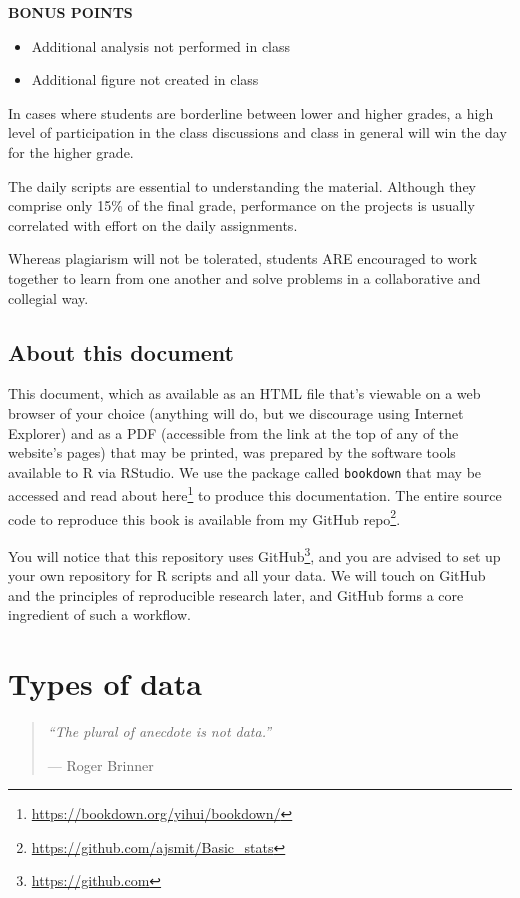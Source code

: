 \documentclass[english,10pt,a4paper,oneside]{book}
\renewcommand{\href}[2]{#2\footnote{\url{#1}}}
\let\rmarkdownfootnote\footnote%
\def\footnote{\protect\rmarkdownfootnote}
\providecommand{\tightlist}{%
  \setlength{\itemsep}{0pt}\setlength{\parskip}{0pt}}
\theoremstyle{definition}
\theoremstyle{definition}
\theoremstyle{definition}
\theoremstyle{remark}
\begin{document}
\textbf{BONUS POINTS}

\begin{itemize}
\tightlist
\item
  Additional analysis not performed in class
\item
  Additional figure not created in class
\end{itemize}

In cases where students are borderline between lower and higher grades,
a high level of participation in the class discussions and class in
general will win the day for the higher grade.

The daily scripts are essential to understanding the material. Although
they comprise only 15\% of the final grade, performance on the projects
is usually correlated with effort on the daily assignments.

Whereas plagiarism will not be tolerated, students ARE encouraged to
work together to learn from one another and solve problems in a
collaborative and collegial way.

\section{About this document}\label{about-this-document}

This document, which as available as an HTML file that's viewable on a
web browser of your choice (anything will do, but we discourage using
Internet Explorer) and as a PDF (accessible from the link at the top of
any of the website's pages) that may be printed, was prepared by the
software tools available to R via RStudio. We use the package called
\texttt{bookdown} that may be accessed and read about
\href{https://bookdown.org/yihui/bookdown/}{here} to produce this
documentation. The entire source code to reproduce this book is
available from my \href{https://github.com/ajsmit/Basic_stats}{GitHub
repo}.

You will notice that this repository uses
\href{https://github.com}{GitHub}, and you are advised to set up your
own repository for R scripts and all your data. We will touch on GitHub
and the principles of reproducible research later, and GitHub forms a
core ingredient of such a workflow.

\chapter{Types of data}\label{types-of-data}

\begin{quote}
\emph{\enquote{The plural of anecdote is not data.}}

--- Roger Brinner
\end{quote}
\end{document}
